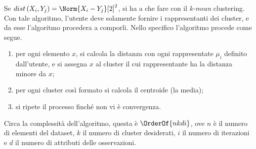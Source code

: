 \documentclass{subfiles}
\begin{document}
Se \(dist\left(X_{i}, Y_{j}\right) = \Norm{X_{i} - Y_{j}}[2]^{2}\), si ha a che fare con il \emph{k-mean} clustering.
Con tale algoritmo, l'utente deve solamente fornire i rappresentanti dei cluster, e da esse l'algoritmo procedera a comporli.
Nello specifico l'algoritmo procede come segue.
\begin{enumerate}
    \item per ogni elemento \(x\), si calcola la distanza con ogni rappresentate \(\mu_{i}\) definito dall'utente,
          e si assegna \(x\) al cluster il cui rappresentante ha la distanza minore da \(x\);
    \item per ogni cluster così formato si calcola il centroide (la media);
    \item si ripete il processo finché non vi è convergenza\footnotemark[3].
\end{enumerate}

Circa la complessità dell'algoritmo, questa è \(\OrderOf{nkdi}\), ove \(n\) è il numero di elementi del dataset, \(k\) il numero di cluster desiderati,
\(i\) il numero di iterazioni e \(d\) il numero di attributi delle osservazioni.
\end{document}
